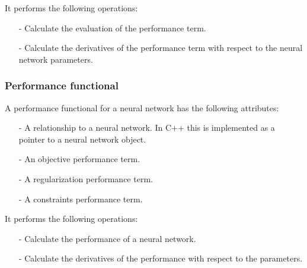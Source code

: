 It performs the following operations:

\begin{itemize}
\item[-] Calculate the evaluation of the performance term. 
\item[-] Calculate the derivatives of the performance term with respect to the neural network parameters.
\end{itemize}
   

\subsubsection*{Performance functional}

A performance functional for a neural network has the following attributes:

\begin{itemize}
\item[-] A relationship to a neural network. In C++ this is implemented as a pointer to a neural network object.
\item[-] An objective performance term.
\item[-] A regularization performance term.
\item[-] A constraints performance term.
\end{itemize}

It performs the following operations:

\begin{itemize}
\item[-] Calculate the performance of a neural network.
\item[-] Calculate the derivatives of the performance with respect to the parameters.
\end{itemize}


